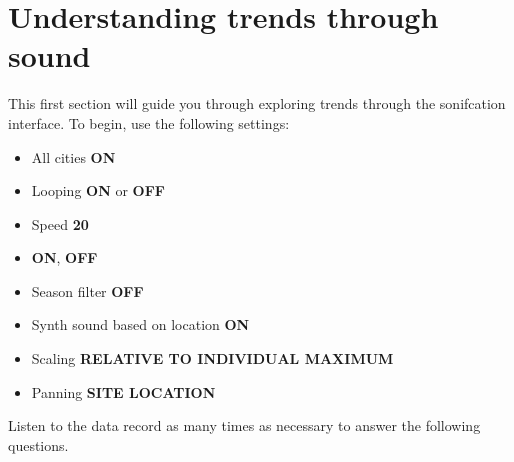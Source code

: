 \documentclass[12pt]{exam}
\begin{document}
\newcommand{\instructions}[1]{%
\vspace{1in}%
\begin{EnvUplevel}
#1
\end{EnvUplevel}
}


\section*{Understanding trends through sound}

\noindent This first section will guide you through exploring  trends through the sonifcation interface. To begin, use the following settings:
\begin{itemize}[noitemsep]
\item All cities \textbf{ON}
\item Looping \textbf{ON} or \textbf{OFF}
\item Speed \textbf{20}
\item {} \textbf{ON},  \textbf{OFF}
\item Season filter \textbf{OFF}
\item Synth sound based on location \textbf{ON}
\item Scaling \textbf{RELATIVE TO INDIVIDUAL MAXIMUM}
\item Panning \textbf{SITE LOCATION}
\end{itemize}

\noindent Listen to the data record as many times as necessary to answer the following questions.
\end{document}
